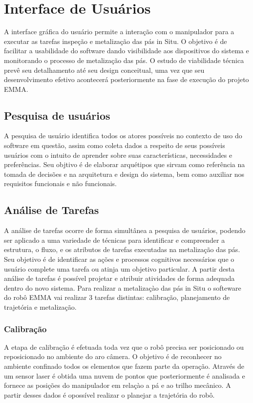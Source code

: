  \section{Interface de Usuários}\label{sec::interface} 

A interface gráfica do usuário permite a interação com o manipulador para a
executar as tarefas inspeção e metalização das pás in Situ. O objetivo é de facilitar a usabilidade do software dando
visibilidade aos dispositivos do sistema e monitorando o processo de metalização das pás.
O estudo de viabilidade técnica prevê seu detalhamento até seu design
conceitual, uma vez que seu desenvolvimento efetivo acontecerá posteriormente na
fase de execução do projeto EMMA.


\subsection{Pesquisa de usuários}
A pesquisa de usuário identifica todos os atores possíveis no contexto de uso do
software em questão, assim como coleta dados a respeito de seus possíveis usuários com o intuito de 
aprender sobre suas características, necessidades e preferências. Seu objtivo é
de elaborar arquétipos que sirvam como referência na tomada de decisões e na
arquitetura e design do sistema, bem como auxiliar nos requisitos funcionais e
não funcionais.


\subsection{Análise de Tarefas}
A análise de tarefas ocorre de forma simultânea a pesquisa de usuários, podendo
ser aplicado a uma variedade de técnicas para identificar e compreender a estrutura, o fluxo, 
e os atributos de tarefas executadas na metalização das pás. Seu objetivo é de
identificar as ações e processos cognitivos necessários que o usuário complete
uma tarefa ou atinja um objetivo particular. A partir desta análise de tarefas é
possível projetar e atribuir atividades de forma adequada dentro do novo sistema.
Para realizar a metalizaçào das pás in Situ o softeware do robô EMMA vai
realizar 3 tarefas distintas: calibração, planejamento de trajetória e
metalização.

\subsubsection{Calibração}
A etapa de calibração é efetuada toda vez que o robô precisa ser
posicionado ou reposicionado no ambiente do aro câmera. O objetivo é de
reconhecer no ambiente confinado todos os elementos que fazem parte da
operação. Através de um sensor laser é obtida uma nuvem de pontos que
posteriormente é analisada e fornece as posições do manipulador em relaçào a pá
e ao trilho mecânico. A partir desses dados é opossível realizar o planejar a
trajetória do robô.


